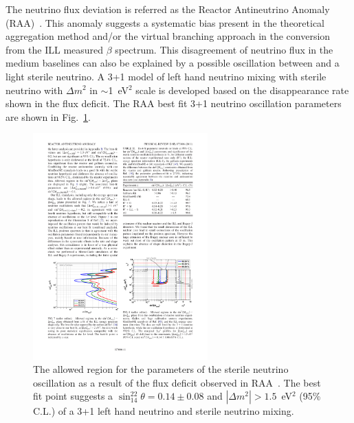     The neutrino flux deviation is referred as the Reactor Antineutrino Anomaly (RAA)~\cite{bib:RAA}.
    This anomaly suggests a systematic bias present in the theoretical aggregation method and/or the virtual branching approach in the conversion from the ILL measured $\beta$ spectrum.
    This disagreement of neutrino flux in the medium baselines can also be explained by a possible oscillation between \nuebar and a light sterile neutrino.
    A 3+1 model of left hand neutrino mixing with sterile neutrino with $\Delta m^2$ in $\sim$1~eV$^2$ scale is developed based on the disappearance rate shown in the flux deficit.
    The RAA best fit 3+1 neutrino oscillation parameters are shown in Fig.~\ref{fig:RAA}.
\begin{figure}[h!]
    \centering
    \includegraphics[width=0.6\textwidth]{Figures/RAA3plus1.pdf}
    \caption[The allowed region for the parameters of sterile oscillation]{The allowed region for the parameters of the sterile neutrino oscillation as a result of the flux deficit observed in RAA~\cite{bib:RAA}. The best fit point suggests a $\sin_{14}^22\theta = 0.14\pm0.08$ and $|\Delta m^2| > 1.5$~eV$^2$ (95\% C.L.) of a 3+1 left hand neutrino and sterile neutrino mixing.}
    \label{fig:RAA}
\end{figure}

